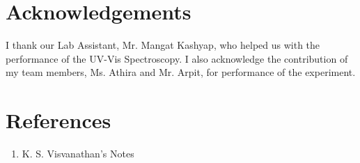\section{Acknowledgements}
I thank our Lab Assistant, Mr. Mangat Kashyap, who helped us with the performance of the UV-Vis Spectroscopy. I also acknowledge the contribution of my team members, Ms. Athira and Mr. Arpit, for performance of the experiment.

\section{References}
	\begin{enumerate}
		\item K. S. Visvanathan's Notes
	\end{enumerate}